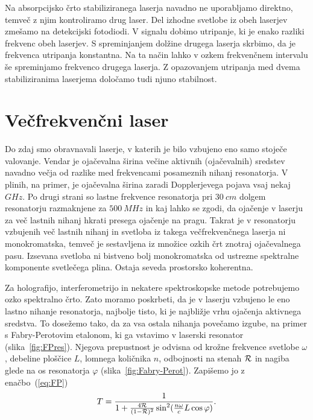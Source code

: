 \begin{remark}
Na absorpcijsko črto stabiliziranega laserja navadno ne uporabljamo
direktno, temveč z njim kontroliramo drug laser. Del izhodne svetlobe iz
obeh laserjev zmešamo na detekcijski fotodiodi. V signalu dobimo utripanje,
ki je enako razliki frekvenc obeh laserjev. S spreminjanjem dolžine drugega
laserja skrbimo, da je frekvenca utripanja konstantna. Na ta način lahko v
ozkem frekvenčnem intervalu še spreminjamo frekvenco drugega laserja.
Z opazovanjem utripanja med dvema stabiliziranima laserjema določamo tudi
njuno stabilnost.
\end{remark}

\section{Večfrekvenčni laser}
Do zdaj smo obravnavali laserje, v katerih je bilo vzbujeno eno samo stoječe
valovanje. Vendar je ojačevalna širina večine aktivnih (ojačevalnih) sredstev 
navadno večja od razlike med frekvencami posameznih 
nihanj resonatorja. V plinih, na primer, je ojačevalna širina zaradi 
Dopplerjevega pojava vsaj nekaj $\si{GHz}$. Po drugi strani so lastne frekvence resonatorja 
pri $30~\si{cm}$ dolgem resonatorju razmaknjene za $500~\si{MHz}$ in kaj  
lahko se zgodi, da ojačenje v laserju za več lastnih nihanj hkrati 
presega ojačenje na pragu. Takrat je v resonatorju vzbujenih več lastnih nihanj in 
svetloba iz takega večfrekvenčnega laserja ni monokromatska,
temveč je sestavljena iz množice ozkih črt znotraj ojačevalnega pasu.
Izsevana svetloba ni bistveno bolj monokromatska od ustrezne spektralne 
komponente svetlečega plina. Ostaja seveda prostorsko koherentna.

Za holografijo, interferometrijo in nekatere spektroskopske metode
potrebujemo ozko spektralno črto. Zato moramo poskrbeti, da je v laserju vzbujeno le
eno lastno nihanje resonatorja, najbolje tisto, ki je najbližje vrhu ojačenja
aktivnega sredstva. To dosežemo tako, da za vsa ostala nihanja povečamo izgube,
na primer s Fabry-Perotovim etalonom, 
ki ga vstavimo v laserski resonator
(slika~\ref{fig:FPres}). Njegova prepustnost je odvisna od krožne frekvence 
svetlobe $\omega$, debeline ploščice $L$, lomnega količnika $n$, odbojnosti na stenah 
${\cal R}$ in nagiba glede na os resonatorja $\varphi$ (slika~\ref{fig:Fabry-Perot}).
Zapišemo jo z enačbo~(\ref{eq:FP}) 
\begin{equation}
T=\frac{1}{1+\frac{4{\cal {R}}}{(1-{\cal {R}})^{2}}\sin^{2}(\frac{n\omega}{c}L\cos \varphi )}.
\label{5.22}
\end{equation}

